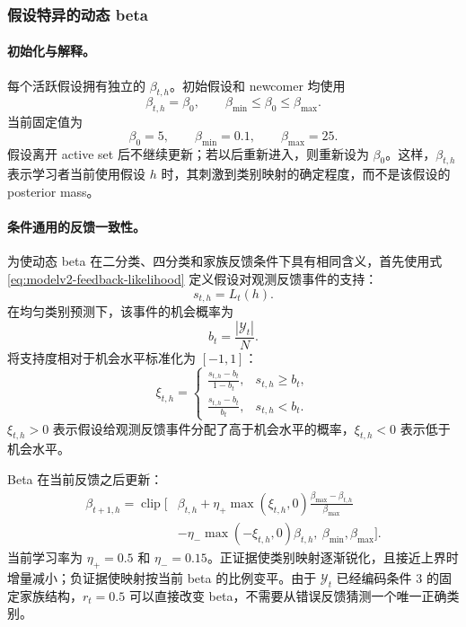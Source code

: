 \subsubsection{假设特异的动态 beta}

\paragraph{初始化与解释。}
每个活跃假设拥有独立的 $\beta_{t,h}$。初始假设和 newcomer 均使用
\begin{equation}
    \beta_{t,h}=\beta_0,
    \qquad
    \beta_{\min}\leq\beta_0\leq\beta_{\max}.
    \label{eq:modelv2-beta-init}
\end{equation}
当前固定值为
\[
    \beta_0=5,\qquad
    \beta_{\min}=0.1,\qquad
    \beta_{\max}=25.
\]
假设离开 active set 后不继续更新；若以后重新进入，则重新设为 $\beta_0$。这样，$\beta_{t,h}$ 表示学习者当前使用假设 $h$ 时，其刺激到类别映射的确定程度，而不是该假设的 posterior mass。

\paragraph{条件通用的反馈一致性。}
为使动态 beta 在二分类、四分类和家族反馈条件下具有相同含义，首先使用式 \ref{eq:modelv2-feedback-likelihood} 定义假设对观测反馈事件的支持：
\[
    s_{t,h}=L_t(h).
\]
在均匀类别预测下，该事件的机会概率为
\begin{equation}
    b_t=\frac{|\mathcal Y_t|}{N}.
    \label{eq:modelv2-feedback-chance}
\end{equation}
将支持度相对于机会水平标准化为 $[-1,1]$：
\begin{equation}
    \xi_{t,h}
    =
    \begin{cases}
    \displaystyle
    \frac{s_{t,h}-b_t}{1-b_t},
    &s_{t,h}\geq b_t,\\[10pt]
    \displaystyle
    \frac{s_{t,h}-b_t}{b_t},
    &s_{t,h}<b_t.
    \end{cases}
    \label{eq:modelv2-beta-evidence}
\end{equation}
$\xi_{t,h}>0$ 表示假设给观测反馈事件分配了高于机会水平的概率，$\xi_{t,h}<0$ 表示低于机会水平。

Beta 在当前反馈之后更新：
\begin{equation}
\begin{aligned}
    \beta_{t+1,h}
    =
    \operatorname{clip}\Bigg[
    &\beta_{t,h}
    +\eta_+\max(\xi_{t,h},0)
    \frac{\beta_{\max}-\beta_{t,h}}{\beta_{\max}}\\
    &-\eta_-\max(-\xi_{t,h},0)\beta_{t,h},
    \ \beta_{\min},\beta_{\max}
    \Bigg].
    \label{eq:modelv2-beta-update}
\end{aligned}
\end{equation}
当前学习率为 $\eta_+=0.5$ 和 $\eta_-=0.15$。正证据使类别映射逐渐锐化，且接近上界时增量减小；负证据使映射按当前 beta 的比例变平。由于 $\mathcal Y_t$ 已经编码条件 3 的固定家族结构，$r_t=0.5$ 可以直接改变 beta，不需要从错误反馈猜测一个唯一正确类别。

